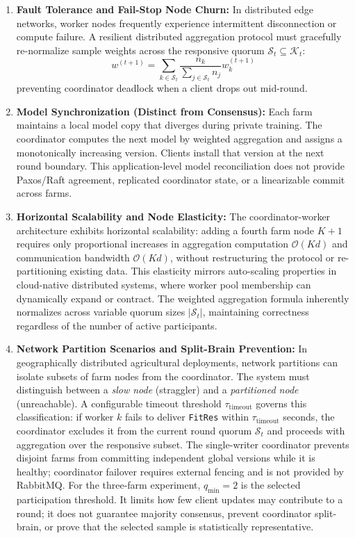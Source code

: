 \documentclass[applsci,article,submit,oneauthor,pdftex]{Definitions/mdpi}
\begin{document}
\begin{enumerate}[leftmargin=*]
    \item \textbf{Fault Tolerance and Fail-Stop Node Churn:} In distributed edge networks, worker nodes frequently experience intermittent disconnection or compute failure. A resilient distributed aggregation protocol must gracefully re-normalize sample weights across the responsive quorum $\mathcal{S}_t \subseteq \mathcal{K}_t$:
    \begin{equation}
    w^{(t+1)} = \sum_{k \in \mathcal{S}_t} \frac{n_k}{\sum_{j \in \mathcal{S}_t} n_j} w_k^{(t+1)}
    \label{eq:fault_tolerant_agg}
    \end{equation}
    preventing coordinator deadlock when a client drops out mid-round.
    \item \textbf{Model Synchronization (Distinct from Consensus):} Each farm maintains a local model copy that diverges during private training. The coordinator computes the next model by weighted aggregation and assigns a monotonically increasing version. Clients install that version at the next round boundary. This application-level model reconciliation does not provide Paxos/Raft agreement, replicated coordinator state, or a linearizable commit across farms.
    \item \textbf{Horizontal Scalability and Node Elasticity:} The coordinator-worker architecture exhibits horizontal scalability: adding a fourth farm node $K+1$ requires only proportional increases in aggregation computation $\mathcal{O}(Kd)$ and communication bandwidth $\mathcal{O}(Kd)$, without restructuring the protocol or re-partitioning existing data. This elasticity mirrors auto-scaling properties in cloud-native distributed systems, where worker pool membership can dynamically expand or contract. The weighted aggregation formula inherently normalizes across variable quorum sizes $|\mathcal{S}_t|$, maintaining correctness regardless of the number of active participants.
    \item \textbf{Network Partition Scenarios and Split-Brain Prevention:} In geographically distributed agricultural deployments, network partitions can isolate subsets of farm nodes from the coordinator. The system must distinguish between a \textit{slow node} (straggler) and a \textit{partitioned node} (unreachable). A configurable timeout threshold $\tau_{\text{timeout}}$ governs this classification: if worker $k$ fails to deliver \texttt{FitRes} within $\tau_{\text{timeout}}$ seconds, the coordinator excludes it from the current round quorum $\mathcal{S}_t$ and proceeds with aggregation over the responsive subset. The single-writer coordinator prevents disjoint farms from committing independent global versions while it is healthy; coordinator failover requires external fencing and is not provided by RabbitMQ. For the three-farm experiment, $q_{\min}=2$ is the selected participation threshold. It limits how few client updates may contribute to a round; it does not guarantee majority consensus, prevent coordinator split-brain, or prove that the selected sample is statistically representative.

\end{enumerate}
\end{document}
